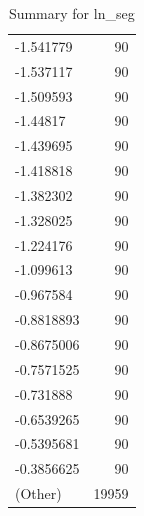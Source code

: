 \begin{table}[ht]
\begin{tabular}{lr}
  -1.541779 &  90 \\ 
  -1.537117 &  90 \\ 
  -1.509593 &  90 \\ 
  -1.44817 &  90 \\ 
  -1.439695 &  90 \\ 
  -1.418818 &  90 \\ 
  -1.382302 &  90 \\ 
  -1.328025 &  90 \\ 
  -1.224176 &  90 \\ 
  -1.099613 &  90 \\ 
  -0.967584 &  90 \\ 
  -0.8818893 &  90 \\ 
  -0.8675006 &  90 \\ 
  -0.7571525 &  90 \\ 
  -0.731888 &  90 \\ 
  -0.6539265 &  90 \\ 
  -0.5395681 &  90 \\ 
  -0.3856625 &  90 \\ 
  (Other) & 19959 \\ 
   \hline
\end{tabular}
\caption{Summary for ln_seg} 
\label{tab: ln_seg}
\end{table}
